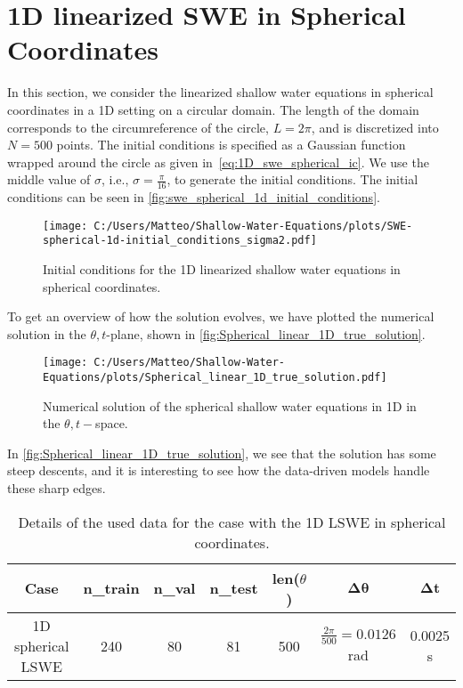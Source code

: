 \section{1D linearized SWE in Spherical Coordinates}
In this section, we consider the linearized shallow water equations in spherical coordinates in a 1D setting on a circular domain.
The length of the domain corresponds to the circumreference of the circle, $L = 2\pi$, and is discretized into $N = 500$ points.
The initial conditions is specified as a Gaussian function wrapped around the circle as given in~\eqref{eq:1D_swe_spherical_ic}.
We use the middle value of $\sigma$, i.e., $\sigma = \frac{\pi}{16}$, to generate the initial conditions.
The initial conditions can be seen in \autoref{fig:swe_spherical_1d_initial_conditions}.
\begin{figure}[H]
    \centering
    \texttt{[image: C:/Users/Matteo/Shallow-Water-Equations/plots/SWE-spherical-1d-initial\_conditions\_sigma2.pdf]}
    \caption{Initial conditions for the 1D linearized shallow water equations in spherical coordinates.}\label{fig:swe_spherical_1d_initial_conditions}
\end{figure}
To get an overview of how the solution evolves, we have plotted the numerical solution in the $\theta,t$-plane, shown in \autoref{fig:Spherical_linear_1D_true_solution}.
\begin{figure}[H]
    \centering
    \texttt{[image: C:/Users/Matteo/Shallow-Water-Equations/plots/Spherical\_linear\_1D\_true\_solution.pdf]}
    \caption{Numerical solution of the spherical shallow water equations in 1D in the $\theta,t-$space.}\label{fig:Spherical_linear_1D_true_solution}
\end{figure}
In \autoref{fig:Spherical_linear_1D_true_solution}, we see that the solution has some steep descents, and it is interesting to see how the data-driven models handle these sharp edges.

\begin{table}[H]
    \centering
    \begin{tabular}{c|cccccc}
        \textbf{Case} & \textbf{n\_train} & \textbf{n\_val} & \textbf{n\_test} & \textbf{len}($\theta$) & $\mathbf{\Delta \theta}$ & $\mathbf{\Delta t}$ \\
        \hline
        1D spherical LSWE & 240 & 80 & 81 & 500 & $\frac{2 \pi}{500} = 0.0126$ rad  & 0.0025 s \\
    \end{tabular}
    \caption{Details of the used data for the case with the 1D LSWE in spherical coordinates.}\label{tab:data_1D_LSWE}
\end{table}


